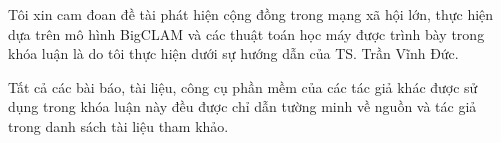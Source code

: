 \begin{loicamdoan}
	\setlength{\parindent}{5ex}
	Tôi xin cam đoan đề tài phát hiện cộng đồng trong mạng xã hội lớn, thực hiện dựa trên mô hình BigCLAM và các thuật toán học máy được trình bày trong khóa luận là do tôi thực hiện dưới sự hướng dẫn của TS. Trần Vĩnh Đức.\par 
	
	Tất cả các bài báo, tài liệu, công cụ phần mềm của các tác giả khác được sử dụng trong khóa luận này đều được chỉ dẫn tường minh về nguồn và tác giả trong danh sách tài liệu tham khảo. 
	
\begin{multicols}{2}
	\qquad\qquad\quad 
	\columnbreak \\
	 \par
	\par \medskip
	\par \medskip
	\par \medskip
	\par \medskip
	\par \medskip
	\par \medskip
	\par \medskip
	\par \medskip
	\par 
\end{multicols}
\end{loicamdoan}